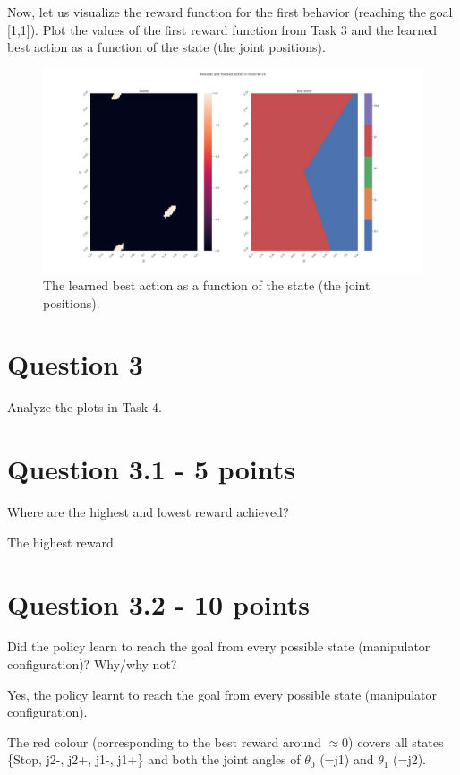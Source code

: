 \documentclass[12pt]{article}
\begin{document}
Now, let us visualize the reward function for the first behavior (reaching the goal [1,1]). Plot the values of the first reward function from Task 3 and the learned best action as a function of the state (the joint positions). 


\begin{figure}[h] 
	\centering  %
    \includegraphics[width=0.9\columnwidth]{img/Figure_task4_VER2.png}
	\caption{The learned best action as a function of the state (the joint positions).}
	\label{fig:fig4}
\end{figure}


\section*{Question 3}

Analyze the plots in Task 4.


\section*{Question 3.1 - 5 points}

Where are the highest and lowest reward achieved?
\newline

\noindent
The highest reward 

\section*{Question 3.2 - 10 points}

Did the policy learn to reach the goal from every possible state (manipulator
configuration)? Why/why not?
\newline

\noindent
Yes, the policy learnt to reach the goal from every possible state (manipulator configuration). 

\noindent
The red colour (corresponding to the best reward around $\approx 0$) covers all states \{Stop, j2-, j2+, j1-, j1+\} and both the joint angles of $\theta_0$ (=j1) and $\theta_1$ (=j2).



\pagebreak



\end{document}
